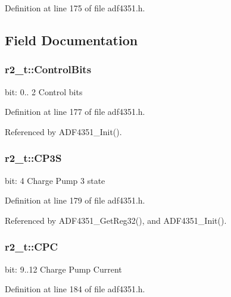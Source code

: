 Definition at line 175 of file adf4351.\+h.



\subsection{Field Documentation}
\subsubsection[{\texorpdfstring{Control\+Bits}{ControlBits}}]{ r2\+\_\+t\+::\+Control\+Bits}\hypertarget{structr2__t_a3afba2088cc33e95e833436e6a111a6a}{}\label{structr2__t_a3afba2088cc33e95e833436e6a111a6a}
bit\+: 0.. 2 Control bits 

Definition at line 177 of file adf4351.\+h.



Referenced by A\+D\+F4351\+\_\+\+Init().

\subsubsection[{\texorpdfstring{C\+P3S}{CP3S}}]{ r2\+\_\+t\+::\+C\+P3S}\hypertarget{structr2__t_a378d00b9682aa05bffb1a3e61da036e4}{}\label{structr2__t_a378d00b9682aa05bffb1a3e61da036e4}
bit\+: 4 Charge Pump 3 state 

Definition at line 179 of file adf4351.\+h.



Referenced by A\+D\+F4351\+\_\+\+Get\+Reg32(), and A\+D\+F4351\+\_\+\+Init().

\subsubsection[{\texorpdfstring{C\+PC}{CPC}}]{ r2\+\_\+t\+::\+C\+PC}\hypertarget{structr2__t_a71530b2c7c16577560cd14f14f320572}{}\label{structr2__t_a71530b2c7c16577560cd14f14f320572}
bit\+: 9..12 Charge Pump Current 

Definition at line 184 of file adf4351.\+h.



